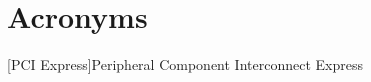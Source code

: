 \cleardoublepage

\chapter*{Acronyms}

\begin{acronym}

[PCI Express]{Peripheral Component Interconnect Express}

\end{acronym}